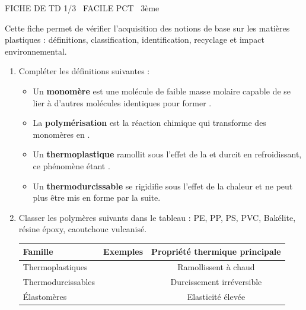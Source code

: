 \documentclass[11pt]{article}
\begin{document}
\begin{tcolorbox}[enhanced,colback=popink,colframe=popink,arc=10pt,boxrule=0pt,left=12pt,right=12pt,top=9pt,bottom=9pt]
{\color{white}\popxbold\small FICHE DE TD 1/3 \textbullet\ FACILE \hfill PCT \textbullet\ 3ème\par}
\end{tcolorbox}
\vspace{4pt}
Cette fiche permet de vérifier l'acquisition des notions de base sur les matières plastiques : définitions, classification, identification, recyclage et impact environnemental.

\begin{exercice}
\begin{enumerate}
    \item Compléter les définitions suivantes :
    \begin{itemize}
        \item Un \textbf{monomère} est une molécule de faible masse molaire capable de se lier à d'autres molécules identiques pour former \underline{\hspace{4cm}}.
        \item La \textbf{polymérisation} est la réaction chimique qui transforme des monomères en \underline{\hspace{4cm}}.
        \item Un \textbf{thermoplastique} ramollit sous l'effet de la \underline{\hspace{3cm}} et durcit en refroidissant, ce phénomène étant \underline{\hspace{3cm}}.
        \item Un \textbf{thermodurcissable} se rigidifie \underline{\hspace{3cm}} sous l'effet de la chaleur et ne peut plus être mis en forme par la suite.
    \end{itemize}
    \item Classer les polymères suivants dans le tableau : \textup{PE}, \textup{PP}, \textup{PS}, \textup{PVC}, Bakélite, résine époxy, caoutchouc vulcanisé.
    \begin{tabular}{|l|c|c|}
    \hline
    Famille & Exemples & Propriété thermique principale \\ \hline
    Thermoplastiques & & Ramollissent à chaud \\ \hline
    Thermodurcissables & & Durcissement irréversible \\ \hline
    Élastomères & & Elasticité élevée \\ \hline
    \end{tabular}
\end{enumerate}
\end{exercice}
\end{document}

